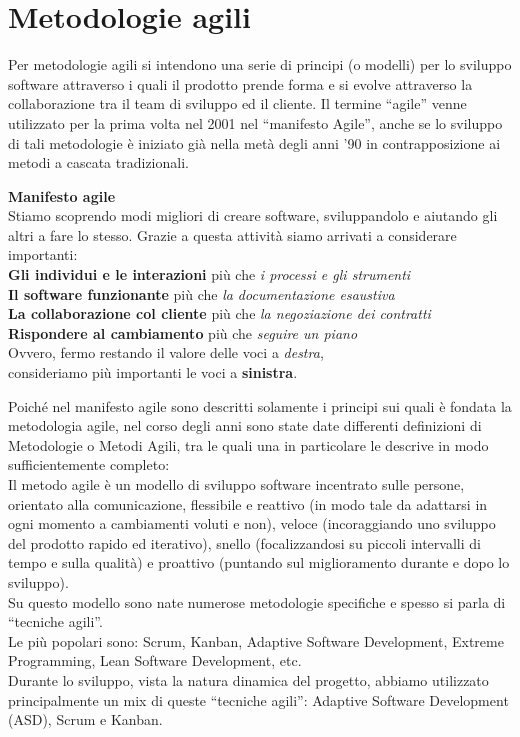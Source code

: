 \section{Metodologie agili}
Per metodologie agili si intendono una serie di principi (o modelli) per lo
sviluppo software attraverso i quali il prodotto prende forma e si evolve
attraverso la collaborazione  tra il team di sviluppo ed il cliente.
Il termine \textquotedblleft{}agile\textquotedblright{} venne utilizzato
 per la prima volta nel 2001 nel \textquotedblleft{}manifesto Agile\textquotedblright{},
 anche se lo sviluppo di tali metodologie è iniziato già nella metà
 degli anni '90 in contrapposizione ai metodi a cascata tradizionali.
\\[1\baselineskip]
\begin{center}
  \textbf{Manifesto agile} \cite{agileManifest-website}
\\[1\baselineskip]
Stiamo scoprendo modi migliori di creare software,
sviluppandolo e aiutando gli altri a fare lo stesso.
Grazie a questa attività siamo arrivati a considerare importanti:
\\[1\baselineskip]

\textbf{Gli individui e le interazioni} più che \textit{i processi e gli strumenti}\\
\textbf{Il software funzionante} più che \textit{la documentazione esaustiva}\\
\textbf{La collaborazione col cliente} più che \textit{la negoziazione dei contratti}\\
\textbf{Rispondere al cambiamento} più che \textit{seguire un piano}
\\[1\baselineskip]

Ovvero, fermo restando il valore delle voci a \textit{destra},\\
consideriamo più importanti le voci a \textbf{sinistra}.
\end{center}
\newpage
Poiché nel manifesto agile sono descritti solamente i principi sui quali è
fondata la metodologia agile, nel corso degli anni sono state date differenti
definizioni di Metodologie o Metodi Agili, tra le quali una in particolare le
descrive in modo sufficientemente completo:\\
Il metodo agile è un modello di sviluppo software incentrato sulle persone,
orientato alla comunicazione, flessibile e reattivo (in modo tale da adattarsi
in ogni momento a cambiamenti voluti e non), veloce (incoraggiando uno sviluppo
del prodotto rapido ed iterativo), snello (focalizzandosi su piccoli intervalli
di tempo e sulla qualità) e proattivo (puntando sul miglioramento durante e
dopo lo sviluppo)\cite{agileMethod-website}.\\
Su questo modello sono nate numerose metodologie specifiche e spesso si parla
di \textquotedblleft{}tecniche agili\textquotedblright{}. \\
Le più popolari sono: Scrum, Kanban, Adaptive Software Development, Extreme Programming, Lean Software Development, etc.\\
Durante lo sviluppo, vista la natura dinamica del progetto, abbiamo utilizzato
principalmente un mix di queste \textquotedblleft{}tecniche agili\textquotedblright{}:
Adaptive Software Development (ASD), Scrum e Kanban.

